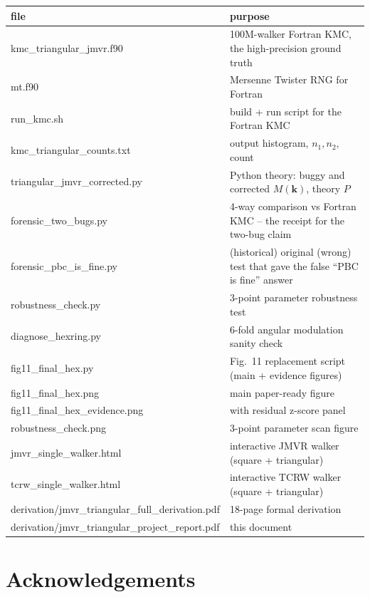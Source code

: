 \documentclass[11pt,a4paper]{article}
\newcommand{\vk}{\mathbf{k}}
\begin{document}
\begin{center}\small
\renewcommand{\arraystretch}{1.18}
\begin{tabular}{lp{8.5cm}}
\toprule
file & purpose \\
\midrule
{\sf kmc\_triangular\_jmvr.f90} & 100M-walker Fortran KMC, the high-precision ground truth \\
{\sf mt.f90} & Mersenne Twister RNG for Fortran \\
{\sf run\_kmc.sh} & build + run script for the Fortran KMC \\
{\sf kmc\_triangular\_counts.txt} & output histogram, $n_1, n_2,$ count \\
{\sf triangular\_jmvr\_corrected.py} & Python theory: buggy and corrected $M(\vk)$, theory $P$ \\
{\sf forensic\_two\_bugs.py} & 4-way comparison vs Fortran KMC -- the receipt for the two-bug claim \\
{\sf forensic\_pbc\_is\_fine.py} & (historical) original (wrong) test that gave the false ``PBC is fine'' answer \\
{\sf robustness\_check.py} & 3-point parameter robustness test \\
{\sf diagnose\_hexring.py} & 6-fold angular modulation sanity check \\
{\sf fig11\_final\_hex.py} & Fig.~11 replacement script (main + evidence figures) \\
{\sf fig11\_final\_hex.png} & main paper-ready figure \\
{\sf fig11\_final\_hex\_evidence.png} & with residual z-score panel \\
{\sf robustness\_check.png} & 3-point parameter scan figure \\
{\sf jmvr\_single\_walker.html} & interactive JMVR walker (square + triangular) \\
{\sf tcrw\_single\_walker.html} & interactive TCRW walker (square + triangular) \\
{\sf derivation/jmvr\_triangular\_full\_derivation.pdf} & 18-page formal derivation \\
{\sf derivation/jmvr\_triangular\_project\_report.pdf} & this document \\
\bottomrule
\end{tabular}
\end{center}

\section{Acknowledgements}\label{sec:thanks}
\end{document}
